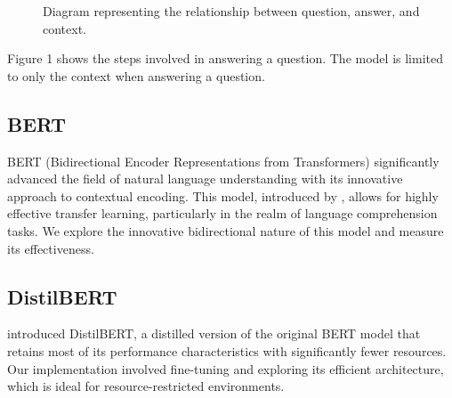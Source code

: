 \documentclass[12pt]{extarticle}
\begin{document}
\begin{figure}[h!]
    \centering
    \begin{adjustbox}{center, scale=0.8}
    \end{adjustbox}
    \caption{Diagram representing the relationship between question, answer, and context.}
    \label{fig:qac_diagram}
\end{figure}

Figure 1 shows the steps involved in answering a question. The model is limited to only the context when answering a question.

\subsection{BERT}

BERT (Bidirectional Encoder Representations from Transformers) significantly advanced the field of natural language understanding with its innovative approach to contextual encoding. This model, introduced by \textcite{devlin2018bert}, allows for highly effective transfer learning, particularly in the realm of language comprehension tasks. We explore the innovative bidirectional nature of this model and measure its effectiveness.

\subsection{DistilBERT}
\textcite{sanh2019distilbert} introduced DistilBERT, a distilled version of the original BERT model that retains most of its performance characteristics with significantly fewer resources. Our implementation involved fine-tuning and exploring its efficient architecture, which is ideal for resource-restricted environments.
\end{document}
